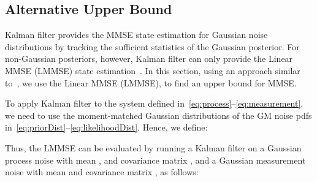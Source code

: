 \documentclass[10pt,twocolumn,twoside]{IEEEtran}
\begin{document}
\subsection{Alternative Upper Bound}
Kalman filter provides the MMSE state estimation for Gaussian noise distributions by tracking the sufficient statistics of the Gaussian posterior. For non-Gaussian posteriors, however, Kalman filter can only provide the Linear MMSE (LMMSE) state estimation~\cite{poor_introduction_1994}. In this section, using an approach similar to~\cite{flam_mmse_2012}, we use the Linear MMSE (LMMSE), to find an upper bound for MMSE. 

To apply Kalman filter to the system defined in~\eqref{eq:process}--\eqref{eq:measurement}, we need to use the moment-matched Gaussian distributions of the GM noise pdfs in~\eqref{eq:priorDist}--\eqref{eq:likelihoodDist}. Hence, we define:

Thus, the LMMSE can be evaluated by running a Kalman filter on a Gaussian process noise with mean , and covariance matrix , and a Gaussian measurement noise with mean  and covariance matrix , as follows:
\end{document}

